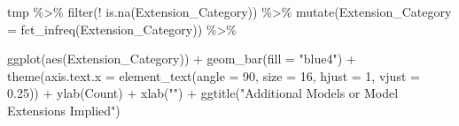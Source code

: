 \documentclass[
]{article}
\newenvironment{Shaded}{\begin{snugshade}}{\end{snugshade}}
\newcommand{\AttributeTok}[1]{\textcolor[rgb]{0.77,0.63,0.00}{#1}}
\newcommand{\CommentTok}[1]{\textcolor[rgb]{0.56,0.35,0.01}{\textit{#1}}}
\newcommand{\ConstantTok}[1]{\textcolor[rgb]{0.00,0.00,0.00}{#1}}
\newcommand{\DecValTok}[1]{\textcolor[rgb]{0.00,0.00,0.81}{#1}}
\newcommand{\FloatTok}[1]{\textcolor[rgb]{0.00,0.00,0.81}{#1}}
\newcommand{\FunctionTok}[1]{\textcolor[rgb]{0.00,0.00,0.00}{#1}}
\newcommand{\NormalTok}[1]{#1}
\newcommand{\OtherTok}[1]{\textcolor[rgb]{0.56,0.35,0.01}{#1}}
\newcommand{\SpecialCharTok}[1]{\textcolor[rgb]{0.00,0.00,0.00}{#1}}
\newcommand{\StringTok}[1]{\textcolor[rgb]{0.31,0.60,0.02}{#1}}
\begin{document}
\begin{Shaded}
\end{Shaded}

\begin{Shaded}
\begin{Highlighting}[]
\NormalTok{tmp }\SpecialCharTok{\%\textgreater{}\%}
  \FunctionTok{filter}\NormalTok{(}\SpecialCharTok{!} \FunctionTok{is.na}\NormalTok{(Extension\_Category))  }\SpecialCharTok{\%\textgreater{}\%}
  \FunctionTok{mutate}\NormalTok{(}\AttributeTok{Extension\_Category =} \FunctionTok{fct\_infreq}\NormalTok{(Extension\_Category)) }\SpecialCharTok{\%\textgreater{}\%}
   
  \FunctionTok{ggplot}\NormalTok{(}\FunctionTok{aes}\NormalTok{(Extension\_Category)) }\SpecialCharTok{+}
  \FunctionTok{geom\_bar}\NormalTok{(}\AttributeTok{fill =} \StringTok{"blue4"}\NormalTok{) }\SpecialCharTok{+}
  \FunctionTok{theme}\NormalTok{(}\AttributeTok{axis.text.x =} \FunctionTok{element\_text}\NormalTok{(}\AttributeTok{angle =} \DecValTok{90}\NormalTok{, }\AttributeTok{size =} \DecValTok{16}\NormalTok{,}
                                   \AttributeTok{hjust =} \DecValTok{1}\NormalTok{, }\AttributeTok{vjust =} \FloatTok{0.25}\NormalTok{)) }\SpecialCharTok{+}
  \FunctionTok{ylab}\NormalTok{(}\StringTok{\textquotesingle{}Count\textquotesingle{}}\NormalTok{) }\SpecialCharTok{+}
  \FunctionTok{xlab}\NormalTok{(}\StringTok{""}\NormalTok{) }\SpecialCharTok{+}
  \FunctionTok{ggtitle}\NormalTok{(}\StringTok{"Additional Models or Model Extensions Implied"}\NormalTok{)}
\end{Highlighting}
\end{Shaded}
\end{document}

